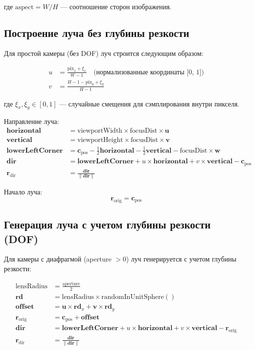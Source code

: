 \documentclass[14pt, a4paper]{extarticle}
\begin{document}
где $\text{aspect} = W/H$ --- соотношение сторон изображения.

\subsection{Построение луча без глубины резкости}

Для простой камеры (без DOF) луч строится следующим образом:

\begin{align}
u &= \frac{\text{pix}_x + \xi_x}{W - 1} \quad \text{(нормализованные координаты [0, 1])} \\
v &= \frac{H - 1 - \text{pix}_y + \xi_y}{H - 1}
\end{align}

где $\xi_x, \xi_y \in [0, 1]$ --- случайные смещения для сэмплирования внутри пикселя.

Направление луча:
\begin{align}
\mathbf{horizontal} &= \text{viewportWidth} \times \text{focusDist} \times \mathbf{u} \\
\mathbf{vertical} &= \text{viewportHeight} \times \text{focusDist} \times \mathbf{v} \\
\mathbf{lowerLeftCorner} &= \mathbf{c}_{\text{pos}} - \frac{1}{2}\mathbf{horizontal} - \frac{1}{2}\mathbf{vertical} - \text{focusDist} \times \mathbf{w} \\
\mathbf{dir} &= \mathbf{lowerLeftCorner} + u \times \mathbf{horizontal} + v \times \mathbf{vertical} - \mathbf{c}_{\text{pos}} \\
\mathbf{r}_{\text{dir}} &= \frac{\mathbf{dir}}{\|\mathbf{dir}\|}
\end{align}

Начало луча:
\[
\mathbf{r}_{\text{orig}} = \mathbf{c}_{\text{pos}}
\]

\subsection{Генерация луча с учетом глубины резкости (DOF)}

Для камеры с диафрагмой (aperture $> 0$) луч генерируется с учетом глубины резкости:

\begin{align}
\text{lensRadius} &= \frac{\text{aperture}}{2} \\
\mathbf{rd} &= \text{lensRadius} \times \text{randomInUnitSphere}() \\
\mathbf{offset} &= \mathbf{u} \times \mathbf{rd}_x + \mathbf{v} \times \mathbf{rd}_y \\
\mathbf{r}_{\text{orig}} &= \mathbf{c}_{\text{pos}} + \mathbf{offset} \\
\mathbf{dir} &= \mathbf{lowerLeftCorner} + u \times \mathbf{horizontal} + v \times \mathbf{vertical} - \mathbf{r}_{\text{orig}} \\
\mathbf{r}_{\text{dir}} &= \frac{\mathbf{dir}}{\|\mathbf{dir}\|}
\end{align}
\end{document}
